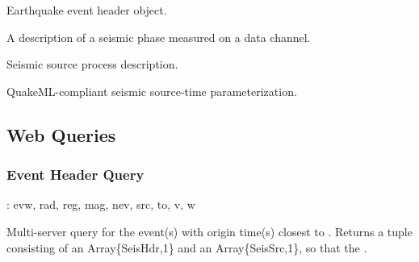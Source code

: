 \documentclass[letterpaper,11pt,english]{sphinxmanual}
\begin{document}
Earthquake event header object.

\begin{fulllineitems}
\label{\detokenize{src/Submodules/quake:SeisPha}}
\end{fulllineitems}


A description of a seismic phase measured on a data channel.

\begin{fulllineitems}
\label{\detokenize{src/Submodules/quake:SeisSrc}}
\end{fulllineitems}


Seismic source process description.

\begin{fulllineitems}
\label{\detokenize{src/Submodules/quake:SourceTime}}
\end{fulllineitems}


QuakeML-compliant seismic source-time parameterization.


\subsection{Web Queries}
\label{\detokenize{src/Submodules/quake:web-queries}}

\subsubsection{Event Header Query}
\label{\detokenize{src/Submodules/quake:event-header-query}}

\begin{fulllineitems}
\end{fulllineitems}


{\hyperref[\detokenize{src/Appendices/keywords:dkw}]{}}: evw, rad, reg, mag, nev, src, to, v, w

Multi-server query for the event(s) with origin time(s) closest to . Returns
a tuple consisting of an Array\{SeisHdr,1\} and an Array\{SeisSrc,1\}, so that
the .
\end{document}
